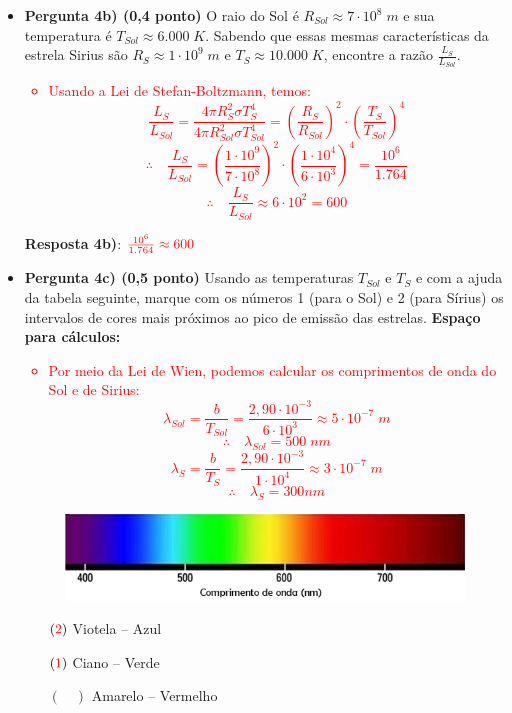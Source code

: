 \documentclass[a4paper, 12pt]{article}
\newcommand{\red}[1]{\textcolor{red}{#1}}
\begin{document}
\begin{flushleft}
\begin{itemize}
\begin{itemize}
					\item \textbf{Pergunta 4b) (0,4 ponto)} O raio do Sol é $R_{Sol} \approx 7 \cdot 10^8 \; m$ e sua temperatura é $T_{Sol} \approx 6.000 \; K$. Sabendo que essas mesmas características da estrela Sirius são $R_S \approx 1 \cdot 10^9 \; m$ e $T_S \approx 10.000 \; K$, encontre a razão $\frac{L_S}{L_{Sol}}$.
						\red{\begin{itemize}
							\item Usando a Lei de Stefan-Boltzmann, temos:
								$$\frac{L_S}{L_{Sol}} = \frac{4 \pi R_S^2 \sigma T_S^4}{4 \pi R_{Sol}^2 \sigma T_{Sol}^4} = \left( \frac{R_S}{R_{Sol}} \right)^2 \cdot \left( \frac{T_S}{T_{Sol}} \right)^4$$
								$$\therefore \quad \frac{L_S}{L_{Sol}} = \left( \frac{1 \cdot 10^9}{7 \cdot 10^8} \right)^2 \cdot \left( \frac{1 \cdot 10^4}{6 \cdot 10^3} \right)^4 = \frac{10^6}{1.764}$$
								$$\therefore \quad \frac{L_S}{L_{Sol}} \approx 6 \cdot 10^2 = 600$$
						\end{itemize}}
						\textbf{Resposta 4b)}: $\red{\frac{10^6}{1.764} \approx 600}$
					\item \textbf{Pergunta 4c) (0,5 ponto)} Usando as temperaturas $T_{Sol}$ e $T_S$ e com a ajuda da tabela seguinte, marque com os números 1 (para o Sol) e 2 (para Sírius) os intervalos de cores mais próximos ao pico de emissão das estrelas. \linebreak
						\textbf{Espaço para cálculos:}
							\red{\begin{itemize}
								\item Por meio da Lei de Wien, podemos calcular os comprimentos de onda do Sol e de Sirius:
									$$\lambda_{Sol} = \frac{b}{T_{Sol}} = \frac{2,90 \cdot 10^{-3}}{6 \cdot 10^3} \approx 5 \cdot 10^{-7} \; m$$
									$$\therefore \quad \lambda_{Sol} = 500 \; nm$$
									$$$$
									$$\lambda_S = \frac{b}{T_S} = \frac{2,90 \cdot 10^{-3}}{1 \cdot 10^{4}} \approx 3 \cdot 10^{-7} \; m$$
									$$\therefore \quad \lambda_S = 300 nm$$
							\end{itemize}}
						\begin{figure}[H]
							\centering
							\includegraphics[scale=0.5]{./img/4.png}
						\end{figure}
						\begin{multicols}{3} \begin{itemize}
							\item[$(\red{2})$] Viotela -- Azul
							\item[$(\red{1})$] Ciano -- Verde
							\item[$(\quad)$] Amarelo -- Vermelho
						\end{itemize} \end{multicols}
				\end{itemize}
		

\end{itemize}
\end{flushleft}
\end{document}
